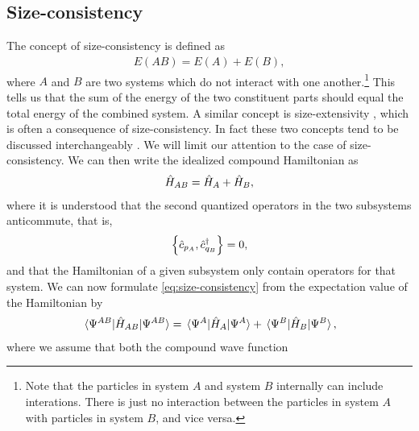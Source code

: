         \subsection{Size-consistency}
            \label{subsec:size-consistency}
            The concept of size-consistency is defined as
            \cite{pople-size-consistency}
            \begin{align}
                E(AB) = E(A) + E(B),
                \label{eq:size-consistency}
            \end{align}
            where $A$ and $B$ are two systems which do not interact with one
            another.\footnote{%
                Note that the particles in system $A$ and system $B$ internally
                can include interations.
                There is just no interaction between the particles in system $A$
                with particles in system $B$, and vice versa.
            }
            This tells us that the sum of the energy of the two constituent
            parts should equal the total energy of the combined system.
            A similar concept is size-extensivity \cite{shavitt2009many}, which
            is often a consequence of size-consistency.
            In fact these two concepts tend to be discussed interchangeably
            \cite{size-extensivity, helgaker-molecular}.
            We will limit our attention to the case of size-consistency.
            We can then write the idealized compound Hamiltonian as
            \begin{align}
                \hat{H}_{AB}
                = \hat{H}_A + \hat{H}_B,
                \label{eq:additively-separable}
            \end{align}
            where it is understood that the second quantized operators in the
            two subsystems anticommute, that is,
            \begin{align}
                \left\{\hat{c}_{{p_A}}, \hat{c}_{{q_B}}^{\dagger}\right\} = 0,
            \end{align}
            and that the Hamiltonian of a given subsystem only contain operators
            for that system.
            We can now formulate \autoref{eq:size-consistency} from the
            expectation value of the Hamiltonian by
            \begin{align}
                \mel*{\Psi^{AB}}{\hat{H}_{AB}}{\Psi^{AB}}
                = \mel*{\Psi^{A}}{\hat{H}_{A}}{\Psi^{A}}
                + \mel*{\Psi^{B}}{\hat{H}_{B}}{\Psi^{B}},
            \end{align}
            where we assume that both the compound wave function
